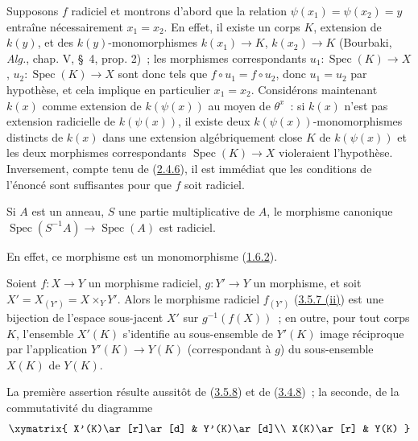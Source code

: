 Supposons $f$ radiciel et montrons d'abord que la relation
$\psi(x_1)=\psi(x_2)=y$ entraîne nécessairement $x_1=x_2$. En effet, il
existe un corps $K$, extension de $k(y)$, et des $k(y)$-monomorphismes
$k(x_1)\to K$, $k(x_2)\to K$ (Bourbaki, \emph{Alg.}, chap. V, \S~4,
prop. 2)~; les morphismes correspondants
$u_1:\operatorname{Spec}(K)\to X$, $u_2:\operatorname{Spec}(K)\to X$ sont
donc tels que $f\circ u_1=f\circ u_2$, donc $u_1=u_2$ par hypothèse, et cela
implique en particulier $x_1=x_2$. Considérons maintenant $k(x)$ comme
extension de $k(\psi(x))$ au moyen de $\theta^x$~: si $k(x)$ n'est pas
extension radicielle de $k(\psi(x))$, il existe deux
$k(\psi(x))$-monomorphismes distincts de $k(x)$ dans une extension
algébriquement close $K$ de $k(\psi(x))$ et les deux morphismes correspondants
$\operatorname{Spec}(K)\to X$ violeraient l'hypothèse. Inversement, compte
tenu de (\hyperref[I.2.4.6-fr]{2.4.6}), il est immédiat que les conditions de
l'énoncé sont suffisantes pour que $f$ soit radiciel.

\begin{corollary}[3.5.9]
\label{I.3.5.9-fr}
Si $A$ est un anneau, $S$ une partie multiplicative de $A$, le morphisme
canonique $\operatorname{Spec}(S^{-1}A)\to\operatorname{Spec}(A)$ est
radiciel.
\end{corollary}

En effet, ce morphisme est un monomorphisme
(\hyperref[I.1.6.2-fr]{1.6.2}).

\begin{corollary}[3.5.10]
\label{I.3.5.10-fr}
Soient $f:X\to Y$ un morphisme radiciel, $g:Y'\to Y$ un morphisme, et soit
$X'=X_{(Y')}=X\times_Y Y'$. Alors le morphisme radiciel $f_{(Y')}$
(\hyperref[I.3.5.7-fr]{3.5.7 (ii)}) est une bijection de l'espace sous-jacent
$X'$ sur $g^{-1}(f(X))$~; en outre, pour tout corps $K$, l'ensemble $X'(K)$
s'identifie au sous-ensemble de $Y'(K)$ image réciproque par l'application
$Y'(K)\to Y(K)$ (correspondant à $g$) du sous-ensemble $X(K)$ de $Y(K)$.
\end{corollary}

La première assertion résulte aussitôt de
(\hyperref[I.3.5.8-fr]{3.5.8}) et de
(\hyperref[I.3.4.8-fr]{3.4.8})~; la seconde, de la commutativité du diagramme
\label{I.3.5.10.base-change-points-diagram-fr}
\[
  \xymatrix{
    X'(K)\ar[r]\ar[d] & Y'(K)\ar[d]\\
    X(K)\ar[r] & Y(K)
  }
\]

